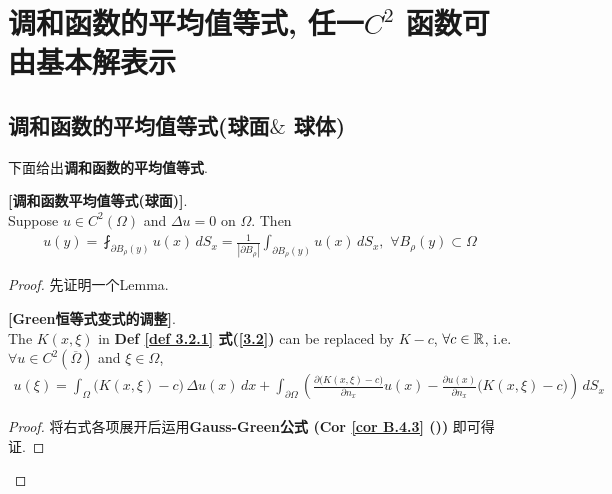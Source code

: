 \newpage

\section{调和函数的平均值等式, 任一$C^2$ 函数可由基本解表示}

\subsection{调和函数的平均值等式(球面$\&$ 球体)}

	下面给出\textbf{调和函数的平均值等式}. 
	
	\vspace*{1em}
	
	\begin{proposition}\label{prop 3.3.1}
		\textbf{[调和函数平均值等式(球面)]}. \\
		Suppose $u \in C^2(\Omega)$ and $\Delta u = 0$ on $\Omega$. Then
		\begin{align*}
			u(y) 
			= \fint_{\partial B_{\rho}(y)} u(x) \, dS_x 
			= \frac{1}{| \partial B_\rho |} \int_{\partial B_{\rho}(y)} u(x) \, dS_x , \,\, \forall B_{\rho}(y) \subset \Omega
		\end{align*}
		
		\vspace*{4em}
		
		\begin{proof}
			先证明一个Lemma. 
			
			\vspace*{2em}
			
			\begin{lemma}\label{lemma 3.3.1}
				\textbf{[Green恒等式变式的调整]}. \\
				The $K(x , \xi)$ in \textbf{Def \ref{def 3.2.1} 式(\ref{3.2})} can be replaced by $K - c$, $\forall c \in \mathbb{R}$, i.e. $\forall u \in C^2\left( \overline{\Omega} \right)$ and $\xi \in \Omega$, 
				\begin{align*}
					u(\xi) 
					= \int_{\Omega} \Big( K(x , \xi) - c \Big) \, \Delta u(x) \, dx 
					+ \int_{\partial \Omega} \left( \frac{\partial \Big( K(x , \xi) - c \Big)}{\partial n_x} u(x) - \frac{\partial u(x)}{\partial n_x} \Big( K(x , \xi) - c \Big) \right) \, dS_x
				\end{align*}
				
				\vspace*{1em}
				
				\begin{proof}
					将右式各项展开后运用\textbf{Gauss-Green公式 (Cor \ref{cor B.4.3} ())} 即可得证. 
				\end{proof}
				

\end{lemma}
\end{proof}
\end{proposition}
